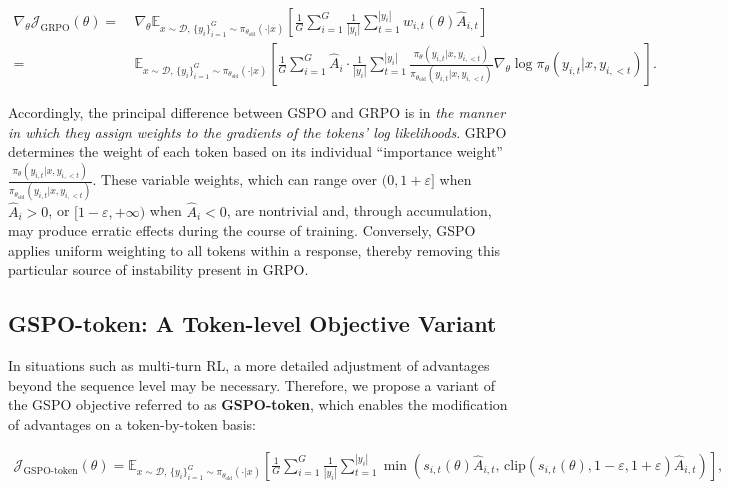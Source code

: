 \begin{align}
\nabla_{\theta} \mathcal{J}_\text{GRPO} (\theta) 
=&\ 
\nabla_{\theta} \mathbb{E}_{ x \sim \mathcal{D},\, \{y_i\}_{i=1}^G \sim \pi_{\theta_\text{old}}( \cdot | x) }
\left[ \frac{1}{G} \sum_{i=1}^{G} \frac{1}{|y_i|} \sum_{t=1}^{|y_i|} 
w_{i,t}(\theta) \widehat{A}_{i,t}
\right] \\
=&\
\mathbb{E}_{ x \sim \mathcal{D},\, \{y_i\}_{i=1}^G \sim \pi_{\theta_\text{old}}( \cdot | x) }
\left[ \frac{1}{G} \sum_{i=1}^{G} \widehat{A}_{i}
\cdot \frac{1}{|y_i|} \sum_{t=1}^{|y_i|}
\frac{ \pi_{\theta} (y_{i,t} | x, y_{i,<t}) }{ \pi_{\theta_\text{old}} (y_{i,t} | x,y_{i,<t})}
\nabla_{\theta} \log \pi_{\theta} (y_{i,t} | x, y_{i,<t})  
\right].
\end{align}

Accordingly, the principal difference between GSPO and GRPO is in \textit{the manner in which they assign weights to the gradients of the tokens' log likelihoods}. GRPO determines the weight of each token based on its individual ``importance weight'' $\frac{ \pi_{\theta} (y_{i,t} | x, y_{i,<t}) }{ \pi_{\theta_\text{old}} (y_{i,t} | x,y_{i,<t})}$. These variable weights, which can range over $(0, 1+\varepsilon]$ when $\widehat{A}_{i} >0$, or $[1-\varepsilon, +\infty)$ when $\widehat{A}_{i} < 0$, are nontrivial and, through accumulation, may produce erratic effects during the course of training. Conversely, GSPO applies uniform weighting to all tokens within a response, thereby removing this particular source of instability present in GRPO.

\subsection{GSPO-token: A Token-level Objective Variant}

In situations such as multi-turn RL, a more detailed adjustment of advantages beyond the sequence level may be necessary. Therefore, we propose a variant of the GSPO objective referred to as \textbf{GSPO-token}, which enables the modification of advantages on a token-by-token basis:

\begin{align}
\mathcal{J}_\text{GSPO-token}(\theta)
=
\mathbb{E}_{ x \sim \mathcal{D},\, \{y_i\}_{i=1}^G \sim \pi_{\theta_\text{old}}( \cdot | x) }
\left[ 
\frac{1}{G} \sum_{i=1}^{G} \frac{1}{|y_i|} \sum_{t=1}^{|y_i|} 
\min \left( s_{i,t}(\theta) \widehat{A}_{i,t},  \, \mathrm{clip} \left( s_{i,t}(\theta), 1 - {\varepsilon}, 1 + {\varepsilon} \right) \widehat{A}_{i,t} \right) 
\right],
\label{equ:gspo-token}
\end{align}


